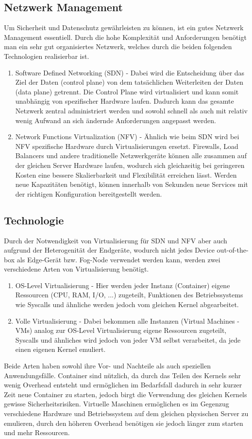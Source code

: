 \documentclass[10pt, a4paper, twocolumn]{article}
\begin{document}
\subsection{Netzwerk Management}
Um Sicherheit und Datenschutz gewährleisten zu können, ist ein gutes Netzwerk Management essentiell. Durch die hohe Komplexität und Anforderungen benötigt man ein sehr gut organisiertes Netzwerk, welches durch die beiden folgenden Technologien realisierbar ist.
\begin{enumerate}
	\item Software Defined Networking (SDN) - Dabei wird die Entscheidung über das Ziel der Daten (control plane) von dem tatsächlichen Weiterleiten der Daten (data plane) getrennt. Die Control Plane wird virtualisiert und kann somit unabhängig von spezifischer Hardware laufen. Dadurch kann das gesamte Netzwerk zentral administriert werden und sowohl schnell als auch mit relativ wenig Aufwand an sich ändernde Anforderungen angepasst werden.
	\item Network Functions Virtualization (NFV) - Ähnlich wie beim SDN wird bei NFV spezifische Hardware durch Virtualisierungen ersetzt. Firewalls, Load Balancers und andere traditionelle Netzwerkgeräte können alle zusammen auf der gleichen Server Hardware laufen, wodurch sich gleichzeitig bei geringeren Kosten eine bessere Skalierbarkeit und Flexibilität erreichen lässt. Werden neue Kapazitäten benötigt, können innerhalb von Sekunden neue Services mit der richtigen Konfiguration bereitgestellt werden.
\end{enumerate}

\subsection{Technologie}
Durch der Notwendigkeit von Virtualisierung für SDN und NFV aber auch aufgrund der Heterogenität der Endgeräte, wodurch nicht jedes Device out-of-the-box als Edge-Gerät bzw. Fog-Node verwendet werden kann, werden zwei verschiedene Arten von Virtualisierung benötigt.
\begin{enumerate}
	\item OS-Level Virtualisierung - Hier werden jeder Instanz (Container) eigene Ressourcen (CPU, RAM, I/O, ...) zugeteilt, Funktionen des Betriebssystems wie Syscalls und ähnliche werden jedoch vom gleichen Kernel abgearbeitet. 
	\item Volle Virtualisierung - Dabei bekommen alle Instanzen (Virtual Machines - VMs) analog zur OS-Level Virtualisierung eigene Ressourcen zugeteilt, Syscalls und ähnliches wird jedoch von jeder VM selbst verarbeitet, da jede einen eigenen Kernel emuliert.
\end{enumerate}
Beide Arten haben sowohl ihre Vor- und Nachteile als auch speziellen Anwendungsfälle. Container sind nützlich, da durch das Teilen des Kernels sehr wenig Overhead entsteht und ermöglichen im Bedarfsfall dadurch in sehr kurzer Zeit neue Container zu starten, jedoch birgt die Verwendung des gleichen Kernels gewisse Sicherheitsrisiken. Virtuelle Maschinen ermöglichen es im Gegenzug verschiedene Hardware und Betriebssystem auf dem gleichen physischen Server zu emulieren, durch den höheren Overhead benötigen sie jedoch länger zum starten und mehr Ressourcen.
\end{document}

